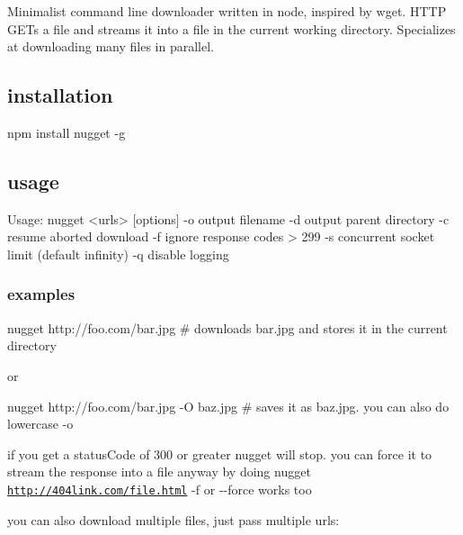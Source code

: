 Minimalist command line downloader written in node, inspired by wget. H\+T\+TP G\+E\+Ts a file and streams it into a file in the current working directory. Specializes at downloading many files in parallel.

\href{https://nodei.co/npm/nugget/}{\tt }  \href{https://travis-ci.org/maxogden/nugget}{\tt }

\subsection*{installation}


\begin{DoxyCode}
npm install nugget -g
\end{DoxyCode}


\subsection*{usage}


\begin{DoxyCode}
Usage: nugget <urls> [options]
  -o    output filename
  -d    output parent directory
  -c    resume aborted download
  -f    ignore response codes > 299
  -s    concurrent socket limit (default infinity)
  -q    disable logging
\end{DoxyCode}


\subsubsection*{examples}


\begin{DoxyCode}
nugget http://foo.com/bar.jpg
# downloads bar.jpg and stores it in the current directory
\end{DoxyCode}


or


\begin{DoxyCode}
nugget http://foo.com/bar.jpg -O baz.jpg
# saves it as baz.jpg. you can also do lowercase -o
\end{DoxyCode}


if you get a status\+Code of 300 or greater nugget will stop. you can force it to stream the response into a file anyway by doing {\ttfamily nugget \href{http://404link.com/file.html}{\tt http\+://404link.\+com/file.\+html} -\/f} or {\ttfamily -\/-\/force} works too

you can also download multiple files, just pass multiple urls\+:



